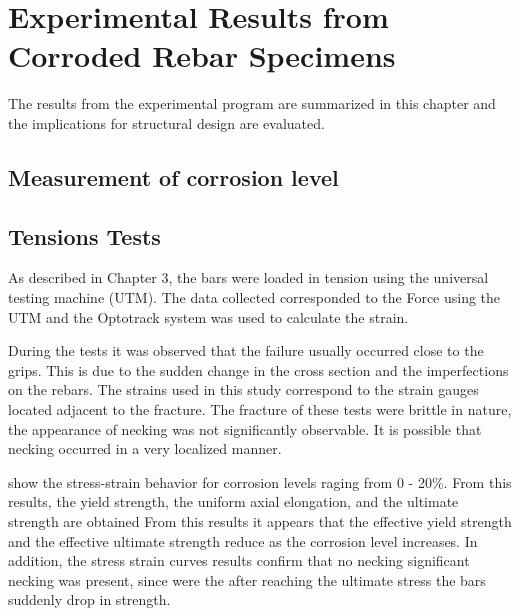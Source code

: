 \chapter{Experimental Results from Corroded Rebar Specimens}
The results from the experimental program are summarized in this chapter and the implications for structural design are evaluated.

\section{Measurement of corrosion level}

\section{Tensions Tests}

As described in Chapter 3, the bars were loaded in tension using the universal testing machine (UTM). The data collected corresponded to the Force using the UTM and the Optotrack system was used to calculate the strain.

During the tests it was observed that the failure usually occurred close to the grips. This is due to the sudden change in the cross section and the imperfections on the rebars. The strains used in this study correspond to the strain gauges located adjacent to the fracture. The fracture of these tests were brittle in nature, the appearance of necking was not significantly observable. It is possible that necking occurred in a very localized manner. 

 show the stress-strain behavior for corrosion levels raging from 0 - 20\%. From this results, the yield strength, the uniform axial elongation, and the ultimate strength are obtained From this results it appears that the effective yield strength and the effective ultimate strength reduce as the corrosion level increases. In addition, the stress strain curves  results confirm that no necking significant necking was present, since were the after reaching the ultimate stress the bars suddenly drop  in strength. 

